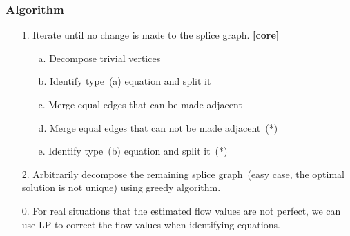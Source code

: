 \frame
{
	\frametitle{Algorithm}
	\begin{itemize}
	\item[1.] Iterate until no change is made to the splice graph. {\bf [core]}
		\vspace{0.2cm}
		\begin{itemize}
		\item[a.] Decompose trivial vertices
		\vspace{0.2cm}
		\item[b.] Identify type~(a) equation and split it
		\vspace{0.2cm}
		\item[c.] Merge equal edges that can be made adjacent
		\vspace{0.2cm}
		\item[d.] Merge equal edges that can not be made adjacent~(*)
		\vspace{0.2cm}
		\item[e.] Identify type~(b) equation and split it~(*)
		\vspace{0.2cm}
		\end{itemize}
	\item[2.] Arbitrarily decompose the remaining splice graph~(easy case, the optimal
			solution is not unique) using greedy algorithm.

	\vspace{0.2cm}
	\item[0.] For real situations that the estimated flow values are not perfect, 
		we can use LP to correct the flow values when identifying equations.

	\end{itemize}
}

